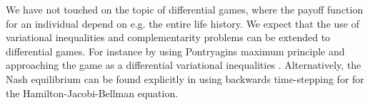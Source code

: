 We have not touched on the topic of differential games, where the payoff function for an individual depend on e.g. the entire life history. We expect that the use of variational inequalities and complementarity problems can be extended to differential games. For instance by using Pontryagins maximum principle and approaching the game as a differential variational inequalities \citep{pang2008differential}. Alternatively, the Nash equilibrium can be found explicitly in using backwards time-stepping for for the Hamilton-Jacobi-Bellman equation.













